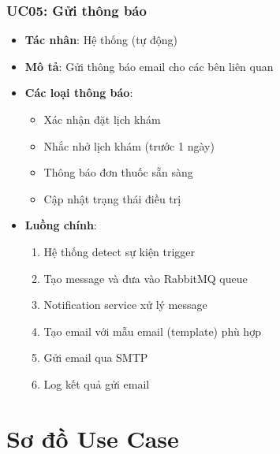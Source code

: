\documentclass[12pt,a4paper]{report}
\begin{document}
\subsubsection{UC05: Gửi thông báo}
\begin{itemize}
    \item \textbf{Tác nhân}: Hệ thống (tự động)
    \item \textbf{Mô tả}: Gửi thông báo email cho các bên liên quan
    \item \textbf{Các loại thông báo}:
    \begin{itemize}
        \item Xác nhận đặt lịch khám
        \item Nhắc nhở lịch khám (trước 1 ngày)
        \item Thông báo đơn thuốc sẵn sàng
        \item Cập nhật trạng thái điều trị
    \end{itemize}
    \item \textbf{Luồng chính}:
    \begin{enumerate}
        \item Hệ thống detect sự kiện trigger
        \item Tạo message và đưa vào RabbitMQ queue
        \item Notification service xử lý message
        \item Tạo email với mẫu email (template) phù hợp
        \item Gửi email qua SMTP
        \item Log kết quả gửi email
    \end{enumerate}
\end{itemize}

\section{Sơ đồ Use Case}
\end{document}
